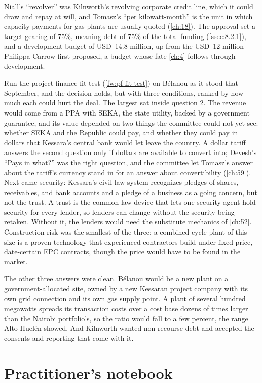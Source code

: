 Niall's ``revolver'' was Kilnworth's revolving corporate credit line, which it could draw and repay at will, and Tomasz's ``per kilowatt-month'' is the unit in which capacity payments for gas plants are usually quoted (\cref{ch:18}). The approval set a target gearing of 75\%, meaning debt of 75\% of the total funding (\cref{ssec:8.2.1}), and a development budget of USD~14.8 million, up from the USD~12 million Philippa Carrow first proposed, a budget whose fate \cref{ch:4} follows through development.

Run the project finance fit test (\cref{fw:pf-fit-test}) on Bélanou as it stood that September, and the decision holds, but with three conditions, ranked by how much each could hurt the deal. The largest sat inside question 2. The revenue would come from a PPA with SEKA, the state utility, backed by a government guarantee, and its value depended on two things the committee could not yet see: whether SEKA and the Republic could pay, and whether they could pay in dollars that Kessara's central bank would let leave the country. A dollar tariff answers the second question only if dollars are available to convert into; Devesh's ``Pays in what?'' was the right question, and the committee let Tomasz's answer about the tariff's currency stand in for an answer about convertibility (\cref{ch:59}). Next came security: Kessara's civil-law system recognizes pledges of shares, receivables, and bank accounts and a pledge of a business as a going concern, but not the trust. A trust is the common-law device that lets one security agent hold security for every lender, so lenders can change without the security being retaken. Without it, the lenders would need the substitute mechanics of \cref{ch:52}. Construction risk was the smallest of the three: a combined-cycle plant of this size is a proven technology that experienced contractors build under fixed-price, date-certain EPC contracts, though the price would have to be found in the market.

The other three answers were clean. Bélanou would be a new plant on a government-allocated site, owned by a new Kessaran project company with its own grid connection and its own gas supply point. A plant of several hundred megawatts spreads its transaction costs over a cost base dozens of times larger than the Nairobi portfolio's, so the ratio would fall to a few percent, the range Alto Huelén showed. And Kilnworth wanted non-recourse debt and accepted the consents and reporting that come with it.

\section{Practitioner's notebook}\label{sec:2.10}

